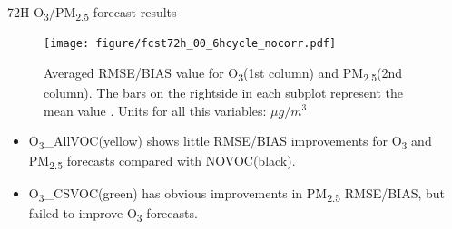 \documentclass[final]{beamer}
\newlength{\colwidth}
\begin{document}
\begin{frame}[t]
\begin{columns}[t]
\begin{column}{\colwidth}
			\begin{alertblock}{72H O\textsubscript{3}/PM\textsubscript{2.5} forecast results}

                \begin{figure}
                  \begin{minipage}[c]{0.8\textwidth}
                    \texttt{[image: figure/fcst72h\_00\_6hcycle\_nocorr.pdf]}
                  \end{minipage}\hfill
                  \begin{minipage}[c]{0.18\textwidth}
                    \caption{Averaged RMSE/BIAS value for O\textsubscript{3}(1st column) and PM\textsubscript{2.5}(2nd column). The bars on the rightside in each subplot represent the mean value . Units for all this variables: $\mu g/m^3$}    
                    \label{fcst_result}
                  \end{minipage}
                \end{figure}
                
                \begin{itemize}
                    \item O\textsubscript{3}\_AllVOC(yellow) shows little RMSE/BIAS improvements for O\textsubscript{3} and PM\textsubscript{2.5} forecasts compared with NOVOC(black). 
                    \item O\textsubscript{3}\_CSVOC(green) has obvious improvements in PM\textsubscript{2.5} RMSE/BIAS, but failed to improve O\textsubscript{3} forecasts.
                    

\end{itemize}
\end{alertblock}
\end{column}
\end{columns}
\end{frame}
\end{document}
